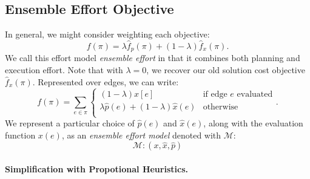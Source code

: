 \subsection{Ensemble Effort Objective}

In general, we might consider weighting each objective:
\begin{equation}
   f(\pi) = \lambda \hat{f}_p(\pi) + (1 - \lambda) \hat{f}_x(\pi) .
   \label{eqn:general-objective}
\end{equation}
We call this effort model
\emph{ensemble effort}
in that it combines both planning and execution effort.
Note that with $\lambda=0$,
we recover our old solution cost objective $\hat{f}_x(\pi)$.
Represented over edges,
we can write:
\begin{equation}
   f(\pi) = \sum_{e \in \pi} \left\{
   \begin{array}{cl}
      (1 - \lambda) x[e] & \mbox{if edge } e \mbox{ evaluated}  \\
      \lambda \hat{p}(e) + (1 - \lambda) \hat{x}(e) & \mbox{otherwise} \\
   \end{array}
   \right.
   .
   \label{eqn:general-objective-explicit}
\end{equation}
We represent a particular choice of $\hat{p}(e)$
and $\hat{x}(e)$,
along with the evaluation function $x(e)$,
as an \emph{ensemble effort model}
denoted with $\mathcal{M}$:
\begin{equation}
   \mathcal{M} : (x, \hat{x}, \hat{p})
\end{equation}

\paragraph{Simplification with Propotional Heuristics.}

